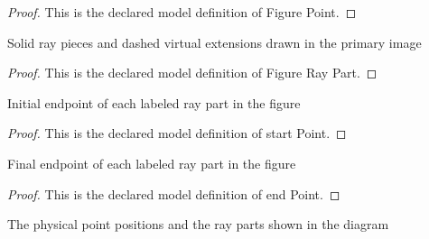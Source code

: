 \begin{proof}
  This is the declared model definition of Figure Point.
\end{proof}
\begin{definition}
  \label{def:physics:phyx-mini-0141:phyxminiproblems-problemphyxmini0141-figureraypart}
  Solid ray pieces and dashed virtual extensions drawn in the primary image
\end{definition}
\begin{proof}
  This is the declared model definition of Figure Ray Part.
\end{proof}
\begin{definition}
  \label{def:physics:phyx-mini-0141:phyxminiproblems-problemphyxmini0141-figureraypart-startpoint}
  Initial endpoint of each labeled ray part in the figure
\end{definition}
\begin{proof}
  This is the declared model definition of start Point.
\end{proof}
\begin{definition}
  \label{def:physics:phyx-mini-0141:phyxminiproblems-problemphyxmini0141-figureraypart-endpoint}
  Final endpoint of each labeled ray part in the figure
\end{definition}
\begin{proof}
  This is the declared model definition of end Point.
\end{proof}
\begin{definition}
  \label{def:physics:phyx-mini-0141:phyxminiproblems-problemphyxmini0141-fullbodyplanemirrordiagram}
  The physical point positions and the ray parts shown in the diagram
\end{definition}
